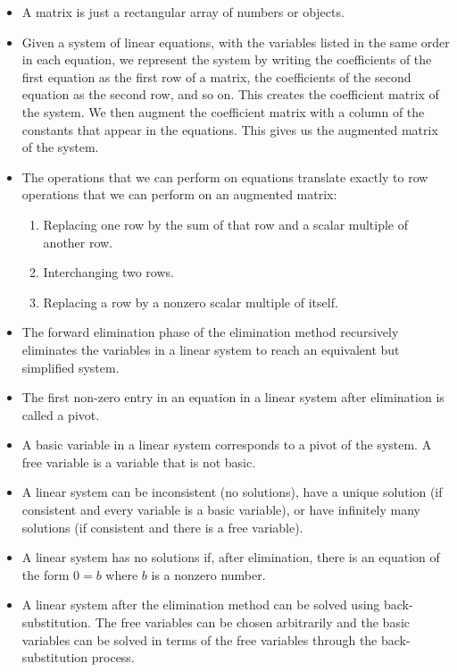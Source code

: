 \label{sec:mtx_sys_summ}

\begin{itemize}
\item A matrix is just a rectangular array of numbers or objects. 
\item Given a system of linear equations, with the variables listed in the same order in each equation, we represent the system by writing the coefficients of the first equation as the first row of a matrix, the coefficients of the second equation as the second row, and so on. This creates the coefficient matrix of the system. We then augment the coefficient matrix with a column of the constants that appear in the equations. This gives us the augmented matrix of the system. 
\item The operations that we can perform on equations translate exactly to row operations that we can perform on an augmented matrix:
\begin{enumerate}
\item Replacing one row by the sum of that row and a scalar multiple of another row.
\item Interchanging two rows.
\item Replacing a row by a nonzero scalar multiple of itself.
\end{enumerate}
\item The forward elimination phase of the elimination method recursively eliminates the variables in a linear system to reach an equivalent but simplified system.
\item The first non-zero entry in an equation in a linear system after elimination is called a pivot.
\item A basic variable in a linear system corresponds to a pivot of the system. A free variable is a variable that is not basic.
\item A linear system can be inconsistent (no solutions), have a unique solution (if consistent and every variable is a basic variable), or have infinitely many solutions (if consistent and there is a free variable).  
\item A linear system has no solutions if, after elimination, there is an equation of the form $0=b$ where $b$ is a nonzero number.
\item A linear system after the elimination method can be solved using back-substitution. The free variables can be chosen arbitrarily and the basic variables can be solved in terms of the free variables through the back-substitution process.
\end{itemize}



